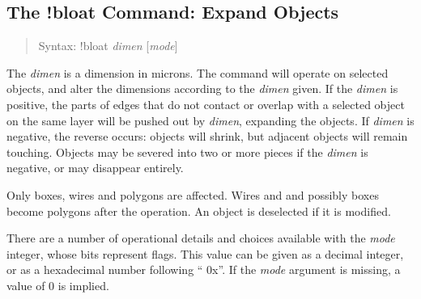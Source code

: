 \subsection{The {\cb !bloat} Command: Expand Objects}
\label{bloatcmd}
\begin{quote}
Syntax: {\vt !bloat} {\it dimen} [{\it mode\/}]
\end{quote}
The {\it dimen} is a dimension in microns.  The command will operate
on selected objects, and alter the dimensions according to the {\it
dimen} given.  If the {\it dimen} is positive, the parts of edges that
do not contact or overlap with a selected object on the same layer
will be pushed out by {\it dimen}, expanding the objects.  If {\it
dimen} is negative, the reverse occurs:  objects will shrink, but
adjacent objects will remain touching.  Objects may be severed into
two or more pieces if the {\it dimen} is negative, or may disappear
entirely.

Only boxes, wires and polygons are affected.  Wires and and possibly
boxes become polygons after the operation.  An object is deselected if
it is modified.

There are a number of operational details and choices available with
the {\it mode} integer, whose bits represent flags.  This value can be
given as a decimal integer, or as a hexadecimal number following ``{\vt
0x}''.  If the {\it mode} argument is missing, a value of 0 is implied.

